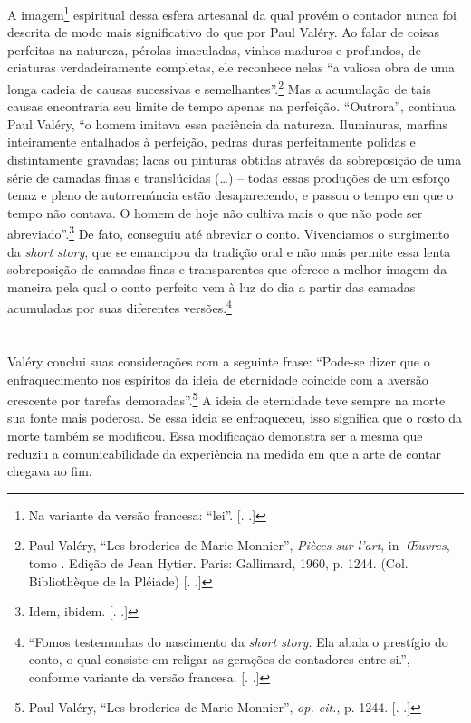 A imagem\footnote{Na variante da versão francesa: ``lei''. [. 
.]} espiritual dessa esfera artesanal da qual provém o contador
nunca foi descrita de modo mais significativo do que por Paul Valéry. Ao
falar de coisas perfeitas na natureza, pérolas imaculadas, vinhos
maduros e profundos, de criaturas verdadeiramente completas, ele
reconhece nelas ``a valiosa obra de uma longa cadeia de causas
sucessivas e semelhantes''.\footnote{Paul Valéry, ``Les broderies de
  Marie Monnier'', \emph{Pièces sur l'art}, in~\emph{Œuvres}, tomo .
  Edição de Jean Hytier. Paris: Gallimard, 1960, p. 1244. (Col.
  Bibliothèque de la Pléiade) [. .]} Mas a acumulação de tais
causas encontraria seu limite de tempo apenas na perfeição. ``Outrora'',
continua Paul Valéry, ``o homem imitava essa paciência da natureza.
Iluminuras, marfins inteiramente entalhados à perfeição, pedras duras
perfeitamente polidas e distintamente gravadas; lacas ou pinturas
obtidas através da sobreposição de uma série de camadas finas e
translúcidas (\ldots{}) -- todas essas produções de um esforço tenaz e pleno
de autorrenúncia estão desaparecendo, e passou o tempo em que o tempo
não contava. O homem de hoje não cultiva mais o que não pode ser
abreviado''.\footnote{Idem, ibidem. [. .]} De fato, conseguiu
até abreviar o conto. Vivenciamos o surgimento da \emph{short story},
que se emancipou da tradição oral e não mais permite essa lenta
sobreposição de camadas finas e transparentes que oferece a melhor
imagem da maneira pela qual o conto perfeito vem à luz do dia a partir
das camadas acumuladas por suas diferentes versões\label{supra7}.\footnote{``Fomos
  testemunhas do nascimento da \emph{short story}. Ela abala o prestígio
  do conto, o qual consiste em religar as gerações de contadores entre
  si.'', conforme variante da versão francesa. [. .]}

\section{}

Valéry conclui suas considerações com a seguinte frase: ``Pode-se dizer
que o enfraquecimento nos espíritos da ideia de eternidade coincide com
a aversão crescente por tarefas demoradas''.\footnote{Paul Valéry, ``Les
  broderies de Marie Monnier'', \emph{op. cit.}, p. 1244. [. .]}
A ideia de eternidade teve sempre na morte sua fonte mais poderosa. Se
essa ideia se enfraqueceu, isso significa que o rosto da morte também se
modificou. Essa modificação demonstra ser a mesma que reduziu a
comunicabilidade da experiência na medida em que a arte de contar
chegava ao fim.

